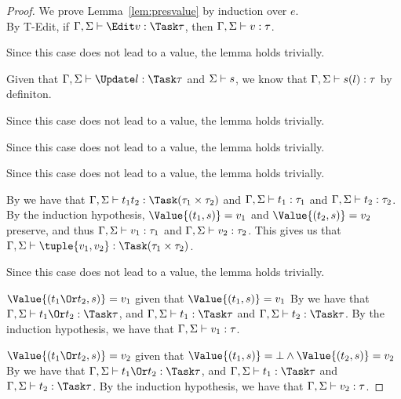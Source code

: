 \begin{proof}
  We prove Lemma~\ref{lem:presvalue} by induction over $e$.\\

      {By T-Edit, if $\Gamma,\Sigma\infers \Edit v:\Task\tau$, then $\Gamma,\Sigma\vdash v:\tau$.}

      {Since this case does not lead to a value, the lemma holds trivially.}

      {Given that $\Gamma,\Sigma\infers\Update l:\Task \tau$ and $\Sigma\vdash s$,
      we know that $\Gamma,\Sigma\vdash s(l):\tau$ by definiton.}

      {Since this case does not lead to a value, the lemma holds trivially.}

      { Since this case does not lead to a value, the lemma holds trivially.}

      {Since this case does not lead to a value, the lemma holds trivially.}

      {By  we have that $\Gamma,\Sigma\infers t_1\And t_2:\Task(\tau_1\times\tau_2)$ and $\Gamma,\Sigma\vdash t_1:\tau_1$ and $\Gamma,\Sigma\vdash t_2:\tau_2$.
      By the induction hypothesis, $ \Value{(t_1,s)}=v_1$ and $\Value{(t_2,s)}=v_2$ preserve, and thus $\Gamma,\Sigma\vdash v_1:\tau_1$ and $\Gamma,\Sigma\vdash v_2:\tau_2$.
      This gives us that $\Gamma,\Sigma\infers \tuple{v_1, v_2}:\Task(\tau_1\times\tau_2)$.}

      { Since this case does not lead to a value, the lemma holds trivially.}

\case
{$\Value{(t_1\Or t_2,s)}=v_1$ given that
  $\Value{(t_1,s)}=v_1$}{
  By  we have that $\Gamma,\Sigma\infers t_1\Or t_2:\Task\tau$,
  and $\Gamma,\Sigma\infers t_1:\Task\tau$ and
  $\Gamma,\Sigma\infers t_2:\Task\tau$. By the induction hypothesis, we have
  that $\Gamma,\Sigma\vdash v_1:\tau$.}

\case
{$\Value{(t_1\Or t_2,s)}=v_2$ given that
  $\Value{(t_1,s)}=\bot\wedge\Value{(t_2,s)}=v_2$}{
  By  we have that $\Gamma,\Sigma\infers t_1\Or t_2:\Task\tau$,
  and $\Gamma,\Sigma\infers t_1:\Task\tau$ and
  $\Gamma,\Sigma\infers t_2:\Task\tau$. By the induction hypothesis, we have
  that $\Gamma,\Sigma\vdash v_2:\tau$.}


\end{proof}
